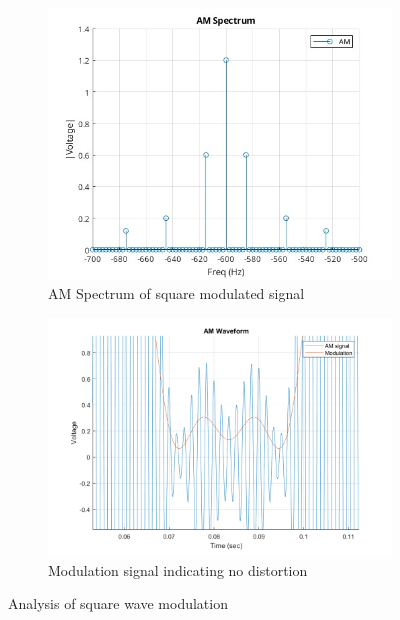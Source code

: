 \documentclass[a4paper, twocolumn]{article}
\begin{document}
        \begin{figure}[H]
            \centering
            \begin{subfigure}{0.45\textwidth}
                \centering
                \includegraphics[width=\textwidth]{Images/AM_RX_1/Square Wave/AM Spectrum.jpg}
                \caption{AM Spectrum of square modulated signal}
                \label{fig:amspectrum-square}
            \end{subfigure}
            \hfill
            \begin{subfigure}{0.45\textwidth}
                \centering
                \includegraphics[width=\textwidth]{Images/AM_RX_1/Square Wave/No Distortion.png}
                \caption{Modulation signal indicating no distortion}
                \label{fig:nodistortion-square}
            \end{subfigure}
            \caption{Analysis of square wave modulation}
        \end{figure}
\end{document}
